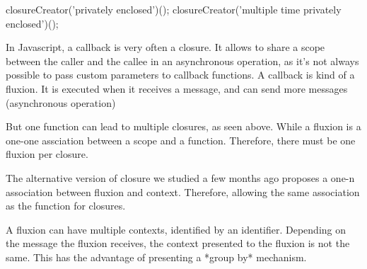 \begin{code}
closureCreator('privately enclosed')();
closureCreator('multiple time privately enclosed')();
\end{code}

In Javascript, a callback is very often a closure.
It allows to share a scope between the caller and the callee in an asynchronous operation, as it's not always possible to pass custom parameters to callback functions.
A callback is kind of a fluxion.
It is executed when it receives a message, and can send more messages (asynchronous operation)

But one function can lead to multiple closures, as seen above.
While a fluxion is a one-one assciation between a scope and a function.
Therefore, there must be one fluxion per closure.



The alternative version of closure we studied a few months ago proposes a one-n association between fluxion and context.
Therefore, allowing the same association as the function for closures.

A fluxion can have multiple contexts, identified by an identifier.
Depending on the message the fluxion receives, the context presented to the fluxion is not the same.
This has the advantage of presenting a *group by* mechanism.




